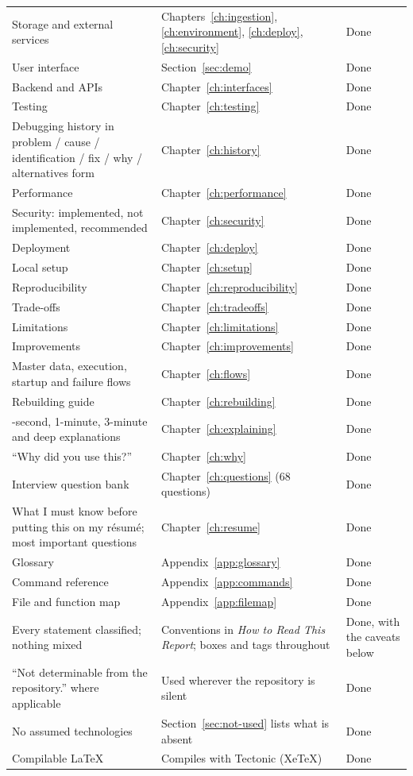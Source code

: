 \begin{longtable}{@{}>{\raggedright\arraybackslash}p{5.6cm}>{\raggedright\arraybackslash}p{7.6cm}>{\raggedright\arraybackslash}p{2.6cm}@{}}
Storage and external services & Chapters~\ref{ch:ingestion}, \ref{ch:environment}, \ref{ch:deploy}, \ref{ch:security} & Done\\
User interface & Section~\ref{sec:demo} & Done\\
Backend and APIs & Chapter~\ref{ch:interfaces} & Done\\
Testing & Chapter~\ref{ch:testing} & Done\\
Debugging history in problem / cause / identification / fix / why / alternatives form & Chapter~\ref{ch:history} & Done\\
Performance & Chapter~\ref{ch:performance} & Done\\
Security: implemented, not implemented, recommended & Chapter~\ref{ch:security} & Done\\
Deployment & Chapter~\ref{ch:deploy} & Done\\
Local setup & Chapter~\ref{ch:setup} & Done\\
Reproducibility & Chapter~\ref{ch:reproducibility} & Done\\
Trade-offs & Chapter~\ref{ch:tradeoffs} & Done\\
Limitations & Chapter~\ref{ch:limitations} & Done\\
Improvements & Chapter~\ref{ch:improvements} & Done\\
Master data, execution, startup and failure flows & Chapter~\ref{ch:flows} & Done\\
Rebuilding guide & Chapter~\ref{ch:rebuilding} & Done\\
30-second, 1-minute, 3-minute and deep explanations & Chapter~\ref{ch:explaining} & Done\\
\enquote{Why did you use this?} & Chapter~\ref{ch:why} & Done\\
Interview question bank & Chapter~\ref{ch:questions} (68 questions) & Done\\
What I must know before putting this on my résumé; most important questions & Chapter~\ref{ch:resume} & Done\\
Glossary & Appendix~\ref{app:glossary} & Done\\
Command reference & Appendix~\ref{app:commands} & Done\\
File and function map & Appendix~\ref{app:filemap} & Done\\
Every statement classified; nothing mixed & Conventions in \emph{How to Read This Report}; boxes and tags throughout & Done, with the caveats below\\
\enquote{Not determinable from the repository.} where applicable & Used wherever the repository is silent & Done\\
No assumed technologies & Section~\ref{sec:not-used} lists what is absent & Done\\
Compilable LaTeX & Compiles with Tectonic (XeTeX) & Done\\
\bottomrule
\end{longtable}

